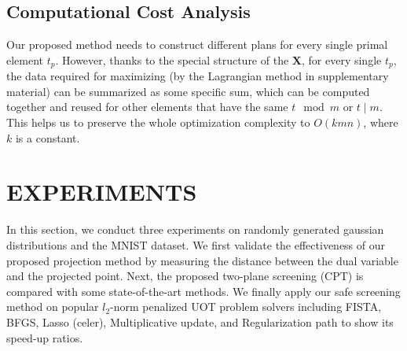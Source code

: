 \documentclass[twoside]{article}
\theoremstyle{plain}
\newcommand{\mat}[1]{\mathbf{#1}}
\begin{document}
\subsection{Computational Cost Analysis}
Our proposed method needs to construct different plans for every single primal element $t_p$. However, thanks to the special structure of the $\mat X$, for every single $t_p$, the data required for maximizing (by the Lagrangian method in supplementary material) can be summarized as some specific sum, which can be computed together and reused for other elements that have the same $t \mod m $ or $t \mid m$. This helps us to preserve the whole optimization complexity to $O(kmn)$, where $k$ is a constant.

\section{EXPERIMENTS}
\label{sec:exp}
In this section, we conduct three experiments on randomly generated gaussian distributions and the MNIST dataset. We first validate the effectiveness of our proposed projection method by measuring the distance between the dual variable and the projected point. Next, the proposed two-plane screening (CPT) is compared with some state-of-the-art methods. We finally apply our safe screening method on popular $l_2$-norm penalized UOT problem solvers including FISTA, BFGS, Lasso (celer), Multiplicative update, and Regularization path to show its speed-up ratios.
\end{document}
